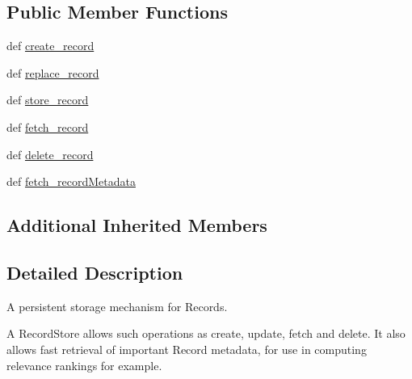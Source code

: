 \subsection*{Public Member Functions}
\begin{DoxyCompactItemize}
\item 
def \hyperlink{classcheshire3_1_1base_objects_1_1_record_store_ad2914668ba32de0fc85e91edbc51a9e3}{create\-\_\-record}
\item 
def \hyperlink{classcheshire3_1_1base_objects_1_1_record_store_abc7c8ff2c3d1173b2960d377d0262e30}{replace\-\_\-record}
\item 
def \hyperlink{classcheshire3_1_1base_objects_1_1_record_store_a3f64b971d17ddb806874262ef3eae215}{store\-\_\-record}
\item 
def \hyperlink{classcheshire3_1_1base_objects_1_1_record_store_a1f8bd3c7b219320146b8d7cbaf16b16f}{fetch\-\_\-record}
\item 
def \hyperlink{classcheshire3_1_1base_objects_1_1_record_store_a254d1e7b97e83296924df25b13a2b0ca}{delete\-\_\-record}
\item 
def \hyperlink{classcheshire3_1_1base_objects_1_1_record_store_ad4848d2d68d86b85af6374fa86f53fd1}{fetch\-\_\-record\-Metadata}
\end{DoxyCompactItemize}
\subsection*{Additional Inherited Members}


\subsection{Detailed Description}
\begin{DoxyVerb}A persistent storage mechanism for Records.

A RecordStore allows such operations as create, update, fetch and delete. 
It also allows fast retrieval of important Record metadata, for use in
computing relevance rankings for example.
\end{DoxyVerb}
 

